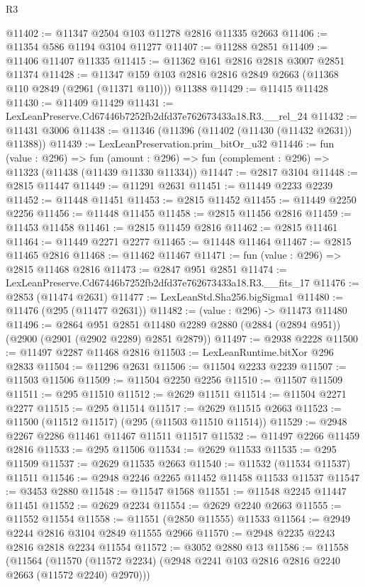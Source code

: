 \begin{lexlean}{R3}
\begin{coremodule}
@11402 := @11347 @2504 @103 @11278 @2816 @11335 @2663
@11406 := @11354 @586 @1194 @3104 @11277
@11407 := @11288 @2851
@11409 := @11406 @11407 @11335
@11415 := @11362 @161 @2816 @2818 @3007 @2851 @11374
@11428 := @11347 @159 @103 @2816 @2816 @2849 @2663 (@11368 @110 @2849 (@2961 (@11371 @110))) @11388
@11429 := @11415 @11428
@11430 := @11409 @11429
@11431 := LexLeanPreserve.Cd67446b7252fb2dfd37e762673433a18.R3.__rel_24
@11432 := @11431 @3006
@11438 := @11346 (@11396 (@11402 (@11430 (@11432 @2631)) @11388))
@11439 := LexLeanPreservation.prim_bitOr_u32
@11446 := fun (value : @296) =>
  fun (amount : @296) => fun (complement : @296) => @11323 (@11438 (@11439 @11330 @11334))
@11447 := @2817 @3104
@11448 := @2815 @11447
@11449 := @11291 @2631
@11451 := @11449 @2233 @2239
@11452 := @11448 @11451
@11453 := @2815 @11452
@11455 := @11449 @2250 @2256
@11456 := @11448 @11455
@11458 := @2815 @11456 @2816
@11459 := @11453 @11458
@11461 := @2815 @11459 @2816
@11462 := @2815 @11461
@11464 := @11449 @2271 @2277
@11465 := @11448 @11464
@11467 := @2815 @11465 @2816
@11468 := @11462 @11467
@11471 := fun (value : @296) => @2815 @11468 @2816
@11473 := @2847 @951 @2851
@11474 := LexLeanPreserve.Cd67446b7252fb2dfd37e762673433a18.R3.__fits_17
@11476 := @2853 (@11474 @2631)
@11477 := LexLeanStd.Sha256.bigSigma1
@11480 := @11476 (@295 (@11477 @2631))
@11482 := (value : @296) -> @11473 @11480
@11496 := @2864
    @951
    @2851
    @11480
    @2289
    @2880
    (@2884 (@2894 @951))
    (@2900 (@2901 (@2902 @2289) @2851 @2879))
@11497 := @2938 @2228
@11500 := @11497 @2287 @11468 @2816
@11503 := LexLeanRuntime.bitXor @296 @2833
@11504 := @11296 @2631
@11506 := @11504 @2233 @2239
@11507 := @11503 @11506
@11509 := @11504 @2250 @2256
@11510 := @11507 @11509
@11511 := @295 @11510
@11512 := @2629 @11511
@11514 := @11504 @2271 @2277
@11515 := @295 @11514
@11517 := @2629 @11515 @2663
@11523 := @11500 (@11512 @11517) (@295 (@11503 @11510 @11514))
@11529 := @2948 @2267 @2286 @11461 @11467 @11511 @11517
@11532 := @11497 @2266 @11459 @2816
@11533 := @295 @11506
@11534 := @2629 @11533
@11535 := @295 @11509
@11537 := @2629 @11535 @2663
@11540 := @11532 (@11534 @11537) @11511
@11546 := @2948 @2246 @2265 @11452 @11458 @11533 @11537
@11547 := @3453 @2880
@11548 := @11547 @1568
@11551 := @11548 @2245 @11447 @11451
@11552 := @2629 @2234
@11554 := @2629 @2240 @2663
@11555 := @11552 @11554
@11558 := @11551 (@2850 @11555) @11533
@11564 := @2949 @2244 @2816 @3104 @2849 @11555 @2966
@11570 := @2948 @2235 @2243 @2816 @2818 @2234 @11554
@11572 := @3052 @2880 @13
@11586 := @11558
    (@11564 (@11570 (@11572 @2234) (@2948 @2241 @103 @2816 @2816 @2240 @2663 (@11572 @2240) @2970)))

\end{coremodule}
\end{lexlean}
